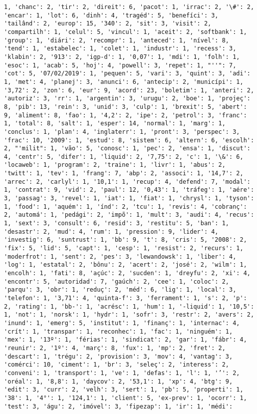 \documentclass[11pt]{article}
\begin{document}
\begin{Verbatim}[commandchars=\\\{\}]
1, 'chanc': 2, 'tir': 2, 'direit': 6, 'pacot': 1, 'irrac': 2, '\#': 2, 'encar': 1, 'lot': 6, 'dinh': 4, 'tragéd': 5, 'benefíci': 3, 'tailând': 2, 'europ': 15, '340': 2, 'sit': 3, 'visit': 2, 'compartilh': 1, 'celul': 5, 'vincul': 1, 'aceit': 2, 'softbank': 1, 'group': 1, 'diári': 2, 'recompr': 1, 'anteced': 1, 'nível': 8, 'tend': 1, 'estabelec': 1, 'colet': 1, 'industr': 1, 'recess': 3, 'klabin': 2, '913': 2, 'igp-d': 1, '0,07': 1, 'mdi': 1, 'folh': 1, 'esoc': 1, 'acab': 5, 'hoj': 4, 'powell': 3, 'repet': 1, "''": 7, 'cot': 5, '07/02/2019': 1, 'pequen': 5, 'vari': 3, 'quint': 3, 'adi': 1, 'met': 4, 'planej': 3, 'anunci': 6, 'antecip': 2, 'municípi': 1, '3,72': 2, 'zon': 6, 'eur': 9, 'acord': 23, 'boletim': 1, 'anteri': 2, 'autoriz': 3, 'rr': 1, 'argentin': 3, 'urugu': 2, 'boe': 1, 'projeç': 8, 'pib': 13, 'rein': 3, 'unid': 3, 'culp': 1, 'brexit': 5, 'abert': 9, 'aliment': 8, 'fao': 1, '4,2': 2, 'ipe': 2, 'petrol': 3, 'franc': 1, 'total': 8, 'salt': 1, 'esper': 14, 'normal': 1, 'marg': 1, 'conclus': 1, 'plan': 4, 'inglaterr': 1, 'pront': 3, 'perspec': 3, 'frac': 10, '2009': 1, 'estud': 8, 'sistem': 6, 'altern': 6, 'escolh': 2, "'milit": 1, 'vão': 5, 'conosc': 1, 'pec': 2, 'ensa': 1, 'discut': 4, 'centr': 5, 'difer': 1, 'liquid': 2, '7,75': 2, 'c': 1, '\&': 6, 'locaweb': 1, 'program': 2, 'traine': 1, 'livr': 1, 'abus': 2, 'twitt': 1, 'tev': 1, 'frang': 7, 'abp': 2, 'associ': 1, '14,7': 2, 'arrec': 2, 'carlyl': 1, '10,1': 1, 'recup': 4, 'defend': 7, 'modal': 1, 'contrat': 9, 'vid': 2, 'paul': 12, '0,43': 1, 'tráfeg': 1, 'aére': 3, 'passag': 3, 'revel': 1, 'iat': 1, 'fiat': 1, 'chrysl': 1, 'tyson': 1, 'food': 1, 'aquém': 1, 'índ': 2, 'tcu': 1, 'revis': 4, 'cobranç': 2, 'automá': 1, 'pedági': 2, 'impõ': 1, 'mult': 3, 'audi': 4, 'recus': 1, 'sext': 3, 'consult': 6, 'resid': 3, 'restitu': 5, 'ban': 1, 'desastr': 2, 'mud': 4, 'rum': 1, 'pression': 9, 'lider': 4, 'investig': 6, 'suntrust': 1, 'bb': 9, 't': 8, 'cris': 5, '2008': 2, 'fix': 5, 'lid': 5, 'capt': 1, 'cesp': 1, 'resist': 2, 'recurs': 1, 'moderfrot': 1, 'sent': 2, 'pes': 3, 'lewandowsk': 1, 'liber': 4, 'log': 1, 'estatal': 2, 'bônu': 2, 'acert': 2, 'josé': 2, 'wilm': 1, 'encolh': 1, 'fati': 8, 'açúc': 2, 'sucden': 1, 'dreyfu': 2, 'xi': 4, 'encontr': 5, 'autoridad': 7, 'gaúch': 2, 'cee': 1, 'coloc': 2, 'parqu': 3, 'obr': 1, 'reduç': 2, 'méd': 6, 'lig': 1, 'local': 3, 'telefon': 1, '3,71': 4, 'quinta-f': 3, 'ferrament': 1, 's': 2, 'p': 2, 'rating': 1, 'bb-': 1, 'acrésc': 1, 'hum': 1, '-liquid': 1, '10,5': 1, 'not': 1, 'norsk': 1, 'hydr': 1, 'sofr': 3, 'restr': 2, 'avers': 2, 'inund': 1, 'emerg': 5, 'institut': 1, 'finanç': 1, 'internac': 4, 'crít': 1, 'transpar': 1, 'reconhec': 1, 'fac': 1, 'ninguém': 1, 'mex': 1, '13º': 1, 'férias': 1, 'sindicat': 2, 'gar': 1, 'fábr': 4, 'reunir': 2, '1º': 4, 'març': 8, 'fux': 1, 'mp': 2, 'fret': 2, 'descart': 1, 'trégu': 2, 'provision': 3, 'mov': 4, 'vantag': 3, 'comérci': 10, 'ciment': 1, 'br': 3, 'seleç': 2, 'interess': 2, 'conveni': 1, 'transport': 1, 've': 1, 'defas': 1, 'l': 1, '’': 2, 'oréal': 1, '8,8': 1, 'daycov': 2, '53,1': 1, 'xp': 4, 'btg': 9, 'edit': 3, 'curr': 2, 'velh': 3, 'sert': 1, 'pb': 5, 'properti': 1, '38': 1, '4°': 1, '124,1': 1, 'client': 5, 'ex-prev': 1, 'ocorr': 1, 'test': 3, 'águ': 2, 'imóvel': 3, 'fipezap': 1, 'ir': 1, 'médi': 
\end{Verbatim}
\end{document}
